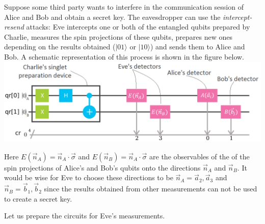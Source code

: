 \documentclass[11pt]{article}
\makeatletter
\def\maxwidth{\ifdim\Gin@nat@width>\linewidth\linewidth
    \else\Gin@nat@width\fi}
\let\Oldincludegraphics\includegraphics
\renewcommand{\includegraphics}[1]{\Oldincludegraphics[width=.8\maxwidth]{#1}}
\makeatother
\begin{document}
    Suppose some third party wants to interfere in the communication session
of Alice and Bob and obtain a secret key. The eavesdropper can use the
\emph{intercept-resend} attacks: Eve intercepts one or both of the
entangled qubits prepared by Charlie, measures the spin projections of
these qubits, prepares new ones depending on the results obtained
(\(\lvert 01 \rangle\) or \(\lvert 10 \rangle\)) and sends them to Alice
and Bob. A schematic representation of this process is shown in the
figure below. \includegraphics{images/ABE_circuit.png}

Here \(E(\vec{n}_A) = \vec{n}_A \cdot \vec{\sigma}\) and
\(E(\vec{n}_B) = \vec{n}_A \cdot \vec{\sigma}\) are the observables of
the of the spin projections of Alice's and Bob's qubits onto the
directions \(\vec{n}_A\) and \(\vec{n}_B\). It would be wise for Eve to
choose these directions to be \(\vec{n}_A = \vec{a}_2,\vec{a}_3\) and
\(\vec{n}_B = \vec{b}_1,\vec{b}_2\) since the results obtained from
other measurements can not be used to create a secret key.

Let us prepare the circuits for Eve's measurements.
\end{document}
